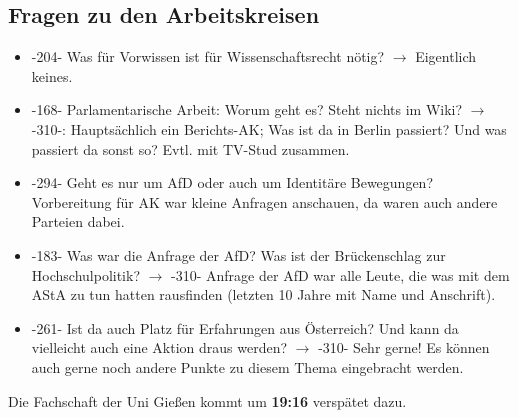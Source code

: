   \subsection{Fragen zu den Arbeitskreisen}
    \begin{itemize}
      \item -204- Was für Vorwissen ist für Wissenschaftsrecht nötig? $\rightarrow$ Eigentlich keines.
      \item -168- Parlamentarische Arbeit: Worum geht es? Steht nichts im Wiki? $\rightarrow$ -310-: Hauptsächlich ein Berichts-AK; Was ist da in Berlin passiert? Und was passiert da sonst so? Evtl. mit TV-Stud zusammen.
      \item -294- Geht es nur um AfD oder auch um Identitäre Bewegungen? Vorbereitung für AK war kleine Anfragen anschauen, da waren auch andere Parteien dabei.
      \item -183- Was war die Anfrage der AfD? Was ist der Brückenschlag zur Hochschulpolitik? $\rightarrow$ -310- Anfrage der AfD war alle Leute, die was mit dem AStA zu tun hatten rausfinden (letzten 10 Jahre mit Name und Anschrift).
      \item -261- Ist da auch Platz für Erfahrungen aus Österreich? Und kann da vielleicht auch eine Aktion draus werden? $\rightarrow$ -310- Sehr gerne! Es können auch gerne noch andere Punkte zu diesem Thema eingebracht werden.
    \end{itemize}

    \begin{info}
      Die Fachschaft der Uni Gießen kommt um \textbf{19:16} verspätet dazu.
    \end{info}

